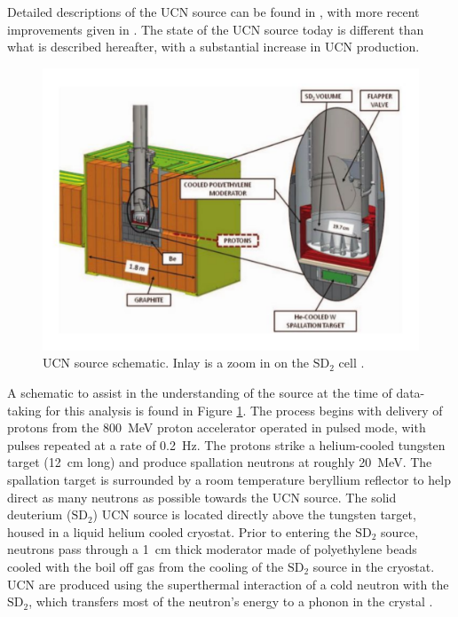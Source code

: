 Detailed descriptions of the UCN source can be found in
\cite{saunders2004demonstration,morris2002measurements,saunders2013performance}, with
more recent improvements given in \cite{ito2017performance}. The state of the
UCN source today is different than what is described hereafter, with a substantial
increase in UCN production.

\begin{figure}[h]
  \centering
  \includegraphics[scale=0.48]{2-UCNAExperiment/source_figure.pdf} 
  \caption{UCN source schematic. Inlay is a zoom in on the
    $\mathrm{SD}_2$ cell \cite{saunders2013performance}.}
  \label{fig:sourceFig}
\end{figure}

A schematic to assist in the understanding of the source at the time of data-taking
for this analysis is found in Figure
\ref{fig:sourceFig}. The process begins with delivery of protons from the 800~MeV proton
accelerator operated in pulsed mode, with pulses repeated at a rate of 0.2~Hz.
The protons strike a helium-cooled tungsten target (12~cm long) and produce
spallation neutrons at roughly 20~MeV. The spallation target is surrounded by
a room temperature beryllium reflector to help direct as many neutrons as
possible towards the UCN source. The solid deuterium ($\mathrm{SD}_2$) UCN source
is located directly above the tungsten target, housed in a liquid helium
cooled cryostat. Prior to entering the $\mathrm{SD}_2$ source, neutrons
pass through a 1~cm thick moderator made of polyethylene beads cooled with the boil off gas
from the cooling of the $\mathrm{SD}_2$ source in the cryostat.
UCN are produced using the superthermal interaction of a cold neutron with the $\mathrm{SD}_2$,
which transfers most of the neutron's energy to a phonon in the crystal \cite{golub1991ultra}.

